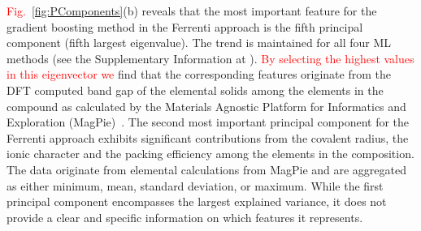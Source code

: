 \documentclass[superscriptaddress,unsortedaddress,
 amsmath,amssymb,
 aps,
]{revtex4-2}
\newcommand{\mrk}[1]{\textcolor{red}{#1}}
\begin{document}
\mrk{Fig.}~\ref{fig:PComponents}(b) reveals that the most important feature for the gradient boosting method in the Ferrenti approach is the fifth principal component (fifth largest eigenvalue). The trend is maintained for all four ML methods (see the Supplementary Information at \cite{supplementary}). \mrk{By selecting the highest values in this eigenvector we} find that the corresponding features originate from the DFT computed band gap of the elemental solids among the elements in the compound as calculated by the Materials Agnostic Platform for Informatics and Exploration (MagPie)~\cite{magpie}. 
The second most important principal component for the Ferrenti approach exhibits significant contributions from the covalent radius, the ionic character and the packing efficiency among the elements in the composition. 
The data originate from elemental calculations from MagPie and are aggregated as either minimum, mean, standard deviation, or maximum. 
While the first principal component encompasses the largest explained variance, it does not provide a clear and specific information on which features it represents. 

\end{document}
